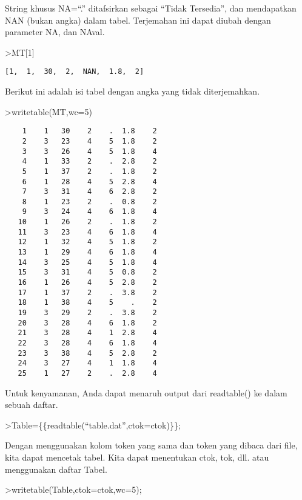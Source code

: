 \documentclass[
]{book}
\begin{document}
String khusus NA=``.'' ditafsirkan sebagai ``Tidak Tersedia'', dan mendapatkan NAN (bukan angka) dalam tabel. Terjemahan ini dapat diubah dengan parameter NA, dan NAval.

\textgreater MT{[}1{]}

\begin{verbatim}
[1,  1,  30,  2,  NAN,  1.8,  2]
\end{verbatim}

Berikut ini adalah isi tabel dengan angka yang tidak diterjemahkan.

\textgreater writetable(MT,wc=5)

\begin{verbatim}
    1    1   30    2    .  1.8    2
    2    3   23    4    5  1.8    2
    3    3   26    4    5  1.8    4
    4    1   33    2    .  2.8    2
    5    1   37    2    .  1.8    2
    6    1   28    4    5  2.8    4
    7    3   31    4    6  2.8    2
    8    1   23    2    .  0.8    2
    9    3   24    4    6  1.8    4
   10    1   26    2    .  1.8    2
   11    3   23    4    6  1.8    4
   12    1   32    4    5  1.8    2
   13    1   29    4    6  1.8    4
   14    3   25    4    5  1.8    4
   15    3   31    4    5  0.8    2
   16    1   26    4    5  2.8    2
   17    1   37    2    .  3.8    2
   18    1   38    4    5    .    2
   19    3   29    2    .  3.8    2
   20    3   28    4    6  1.8    2
   21    3   28    4    1  2.8    4
   22    3   28    4    6  1.8    4
   23    3   38    4    5  2.8    2
   24    3   27    4    1  1.8    4
   25    1   27    2    .  2.8    4
\end{verbatim}

Untuk kenyamanan, Anda dapat menaruh output dari readtable() ke dalam sebuah daftar.

\textgreater Table=\{\{readtable(``table.dat'',ctok=ctok)\}\};

Dengan menggunakan kolom token yang sama dan token yang dibaca dari file, kita dapat mencetak tabel. Kita dapat menentukan ctok, tok, dll. atau menggunakan daftar Tabel.

\textgreater writetable(Table,ctok=ctok,wc=5);
\end{document}
